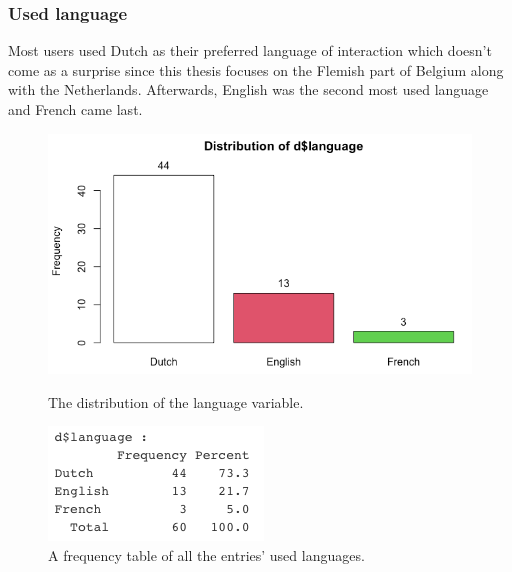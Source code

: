 \subsubsection{Used language}
Most users used Dutch as their preferred language of interaction which doesn't come as a surprise since this thesis focuses on the Flemish part of Belgium along with the Netherlands. Afterwards, English was the second most used language and French came last.
\begin{figure}[!htb]
	\includegraphics[width=\linewidth]{../LaTeX/Figures/Environments/LanguagePlot.png}
	\caption{The distribution of the language variable.}\label{fig:languagePlot}
	\endminipage\hfill
	\includegraphics[width=\linewidth]{../LaTeX/Figures/Environments/LanguageFreq.png}
	\caption{A frequency table of all the entries' used languages.}\label{fig:languageFreq}
	\endminipage\hfill
\end{figure}

